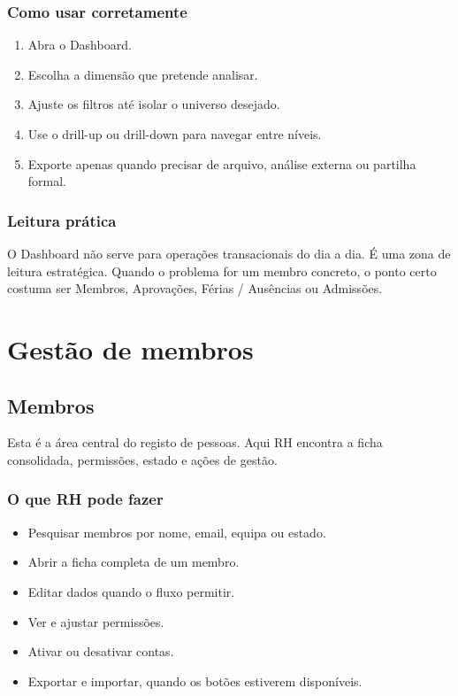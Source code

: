\subsection{Como usar corretamente}
\begin{enumerate}
  \item Abra o Dashboard.
  \item Escolha a dimensão que pretende analisar.
  \item Ajuste os filtros até isolar o universo desejado.
  \item Use o drill-up ou drill-down para navegar entre níveis.
  \item Exporte apenas quando precisar de arquivo, análise externa ou partilha formal.
\end{enumerate}

\subsection{Leitura prática}
O Dashboard não serve para operações transacionais do dia a dia. É uma zona de leitura estratégica. Quando o problema for um membro concreto, o ponto certo costuma ser Membros, Aprovações, Férias / Ausências ou Admissões.

\chapter{Gestão de membros}
\section{Membros}
Esta é a área central do registo de pessoas. Aqui RH encontra a ficha consolidada, permissões, estado e ações de gestão.

\subsection{O que RH pode fazer}
\begin{itemize}
  \item Pesquisar membros por nome, email, equipa ou estado.
  \item Abrir a ficha completa de um membro.
  \item Editar dados quando o fluxo permitir.
  \item Ver e ajustar permissões.
  \item Ativar ou desativar contas.
  \item Exportar e importar, quando os botões estiverem disponíveis.
\end{itemize}

